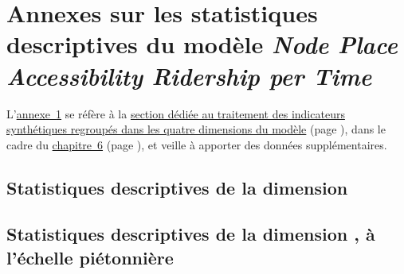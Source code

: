     \setcounter{section}{0}
\chapter{Annexes sur les statistiques descriptives du modèle \textsl{Node Place Accessibility Ridership per Time}}
    \label{annexes:npart}

L'\hyperref[annexes:npart]{annexe~\ref{annexes:npart}} se réfère à la \hyperref[chap6:selection-indicateurs]{section dédiée au traitement des indicateurs synthétiques regroupés dans les quatre dimensions du modèle} (page \pageref{chap6:selection-indicateurs}), dans le cadre du \hyperref[chap6:titre]{chapitre~6} (page \pageref{chap6:titre}), et veille à apporter des données supplémentaires.%

    \setcounter{tocdepth}{2}
    \renewcommand{\localcontentsname}{Structure de l'annexe~\ref{annexes:npart}}
\localtableofcontents

    \newpage
\section{Statistiques descriptives de la dimension }
    \label{annexes:npart-node}


\section{Statistiques descriptives de la dimension , à l'échelle piétonnière}
    \label{annexes:npart-place-pi}


